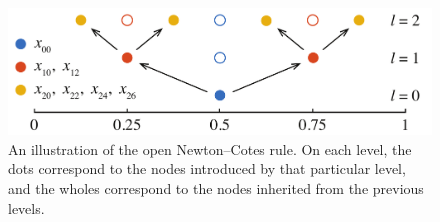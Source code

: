 \begin{figure}[t]
  \centering
  \includegraphics[width=1.0\columnwidth]{include/assets/figures/grid.pdf}
  \vspace{-1em}
  \caption{
    An illustration of the open Newton--Cotes rule. On each level, the dots
    correspond to the nodes introduced by that particular level, and the wholes
    correspond to the nodes inherited from the previous levels.
  }
\end{figure}
